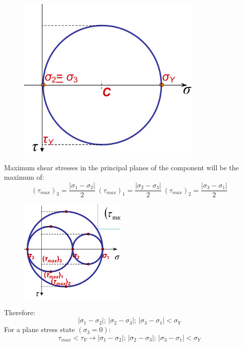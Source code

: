 \documentclass[class=report, crop=false, 12pt,a4paper]{standalone}
\begin{document}
\begin{figure}
\begin{center}
\begin{minipage}[b]{0.46\textwidth}
      \includegraphics[width = 0.8\textwidth]{../img/diagram86.png}
      \caption{}
    \end{minipage}
  \end{center}
\end{figure}
Maximum shear stresses in the principal planes of the component will be the maximum of:
\begin{equation}
  \left(\tau_{max}\right)_3 = \frac{\left| \sigma_1 - \sigma_2 \right| }{2} \ \left(\tau_{max}\right)_1 = \frac{\left| \sigma_2 - \sigma_3 \right| }{2} \ \left(\tau_{max}\right)_2 = \frac{\left| \sigma_3 - \sigma_1 \right| }{2} 
\end{equation}
\begin{figure}[H]
  \centering
  \includegraphics[height = 5cm]{../img/diagram87.png}
  \caption{}
\end{figure}
Therefore:
\begin{equation}
  \left| \sigma_1 - \sigma_2 \right| ; \, \left| \sigma_2 - \sigma_3 \right| ; \, \left| \sigma_3 - \sigma_1 \right| < \sigma_Y
\end{equation}
For a plane stress state $\left(\sigma_3 = 0\right)$:
\begin{equation}
  \tau_{max} < \tau_Y \rightarrow \left| \sigma_1 - \sigma_2 \right| ; \, \left| \sigma_2 - \sigma_3 \right| ; \, \left| \sigma_3 - \sigma_1 \right| < \sigma_Y
\end{equation}
\end{document}
